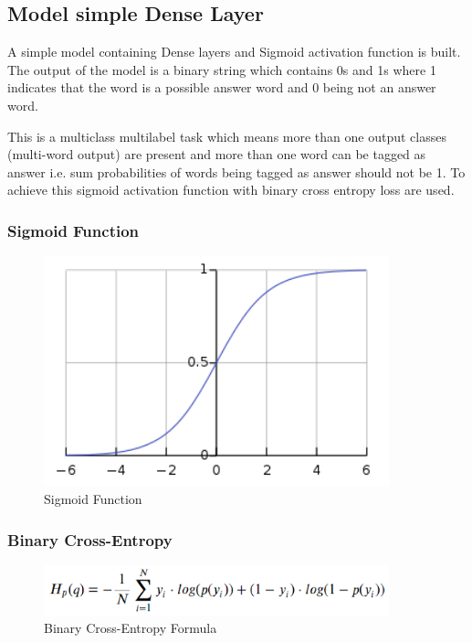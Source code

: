 \subsection{Model simple Dense Layer}
A simple model containing Dense layers and Sigmoid activation function is built.
The output of the model is a binary string which contains 0s and 1s where 1
indicates that the word is a possible answer word and 0 being not an answer
word.

This is a multiclass multilabel task which means more than one output classes
(multi-word output) are present and more than one word can be tagged as answer
i.e. sum probabilities of words being tagged as answer should not be 1. To
achieve this sigmoid activation function with binary cross entropy loss are
used.

\subsubsection{Sigmoid Function}

\begin{figure}
	\caption{Sigmoid Function}
	\centering\includegraphics[width=10cm]{7.png}
\end{figure}

\subsubsection{Binary Cross-Entropy}

\begin{figure}
	\caption{Binary Cross-Entropy Formula}
	\centering\includegraphics[width=10cm]{8.png}
\end{figure}

